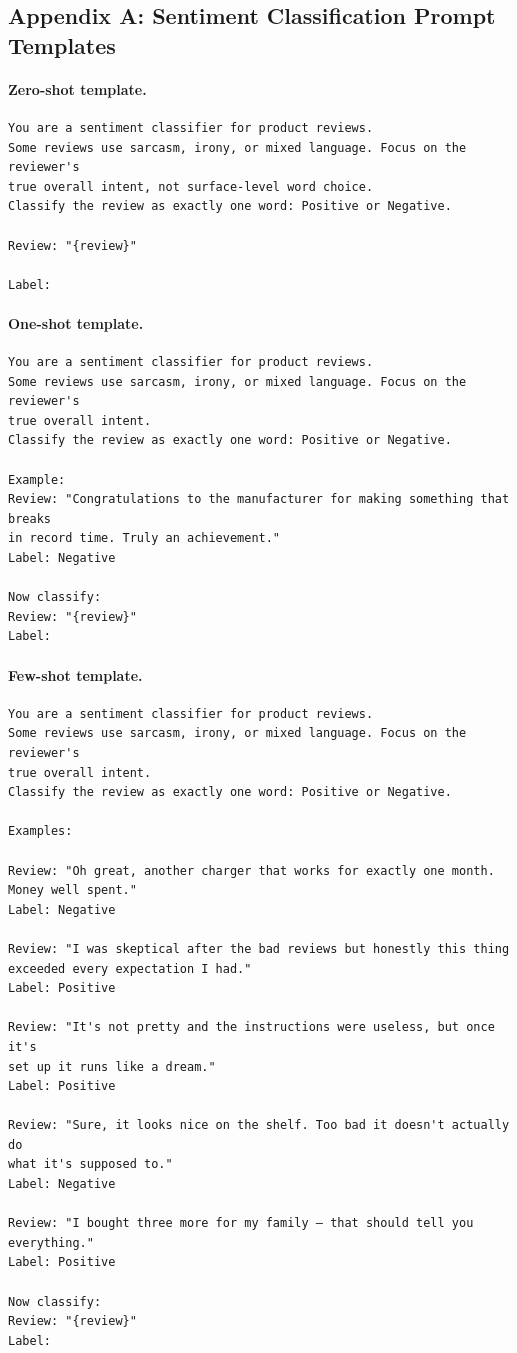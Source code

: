 
\subsection*{Appendix A: Sentiment Classification Prompt Templates}
\label{app:sentiment-prompts}

\paragraph{Zero-shot template.}
\begin{verbatim}
You are a sentiment classifier for product reviews.
Some reviews use sarcasm, irony, or mixed language. Focus on the reviewer's
true overall intent, not surface-level word choice.
Classify the review as exactly one word: Positive or Negative.

Review: "{review}"

Label:
\end{verbatim}

\paragraph{One-shot template.}
\begin{verbatim}
You are a sentiment classifier for product reviews.
Some reviews use sarcasm, irony, or mixed language. Focus on the reviewer's
true overall intent.
Classify the review as exactly one word: Positive or Negative.

Example:
Review: "Congratulations to the manufacturer for making something that breaks
in record time. Truly an achievement."
Label: Negative

Now classify:
Review: "{review}"
Label:
\end{verbatim}

\paragraph{Few-shot template.}
\begin{verbatim}
You are a sentiment classifier for product reviews.
Some reviews use sarcasm, irony, or mixed language. Focus on the reviewer's
true overall intent.
Classify the review as exactly one word: Positive or Negative.

Examples:

Review: "Oh great, another charger that works for exactly one month.
Money well spent."
Label: Negative

Review: "I was skeptical after the bad reviews but honestly this thing
exceeded every expectation I had."
Label: Positive

Review: "It's not pretty and the instructions were useless, but once it's
set up it runs like a dream."
Label: Positive

Review: "Sure, it looks nice on the shelf. Too bad it doesn't actually do
what it's supposed to."
Label: Negative

Review: "I bought three more for my family — that should tell you everything."
Label: Positive

Now classify:
Review: "{review}"
Label:
\end{verbatim}

